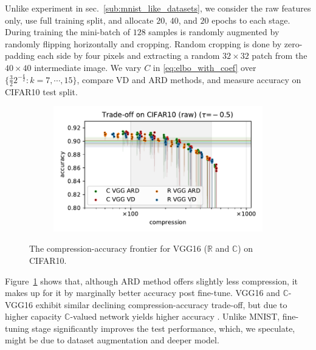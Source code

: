 \documentclass[a4paper,10pt,onecolumn]{article}
\newcommand{\real}{\mathbb{R}}
\newcommand{\cplx}{\mathbb{C}}
\begin{document}
Unlike experiment in sec.~\ref{sub:mnist_like_datasets}, we consider the raw features only,
use full training split, and allocate $20$, $40$, and $20$ epochs to each stage. During training
the mini-batch of $128$ samples is randomly augmented by randomly flipping horizontally and
cropping. Random cropping is done by zero-padding each side by four pixels and extracting a
random $32\times 32$ patch from the $40\times 40$ intermediate image.
%
We vary $C$ in \eqref{eq:elbo_with_coef} over $
  \{\tfrac32 2^{-\tfrac{k}2} \colon k=7, \cdots, 15\}
$, compare VD and ARD methods, and measure accuracy on CIFAR10 test split.

\begin{figure}[!t]
  \centering
  \begin{subfigure}[b]{1.\columnwidth}  %
    \includegraphics[width=\columnwidth]{figure__cifar__trade-off/appendix__augmentedcifar10__raw__-0.5.pdf}
  \end{subfigure}
  \caption{%
    The compression-accuracy frontier for VGG16 ($\real$ and $\cplx$) on CIFAR10.
  }
  \label{fig:figure__cifar10__trade-off}
\end{figure}

Figure~\ref{fig:figure__cifar10__trade-off} shows that, although ARD method offers slightly
less compression, it makes up for it by marginally better accuracy post fine-tune. VGG16 and
$\cplx$-VGG16 exhibit similar declining compression-accuracy trade-off, but due to higher
capacity $\cplx$-valued network yields higher accuracy \citep{monning_evaluation_2018}. Unlike
MNIST, fine-tuning stage significantly improves the test performance, which, we speculate, might
be due to dataset augmentation and deeper model.
\end{document}
